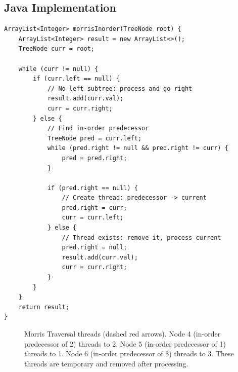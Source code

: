 \documentclass[10pt,journal,compsoc,onecolumn]{IEEEtran}
\begin{document}
\subsection{Java Implementation}
\begin{verbatim}
ArrayList<Integer> morrisInorder(TreeNode root) {
    ArrayList<Integer> result = new ArrayList<>();
    TreeNode curr = root;

    while (curr != null) {
        if (curr.left == null) {
            // No left subtree: process and go right
            result.add(curr.val);
            curr = curr.right;
        } else {
            // Find in-order predecessor
            TreeNode pred = curr.left;
            while (pred.right != null && pred.right != curr) {
                pred = pred.right;
            }

            if (pred.right == null) {
                // Create thread: predecessor -> current
                pred.right = curr;
                curr = curr.left;
            } else {
                // Thread exists: remove it, process current
                pred.right = null;
                result.add(curr.val);
                curr = curr.right;
            }
        }
    }
    return result;
}
\end{verbatim}

\begin{figure}[htbp]
\centering
{}
\caption{Morris Traversal threads (dashed red arrows). Node 4 (in-order predecessor of 2) threads to 2. Node 5 (in-order predecessor of 1) threads to 1. Node 6 (in-order predecessor of 3) threads to 3. These threads are temporary and removed after processing.}
\label{fig:morris_threads}
\end{figure}
\end{document}
